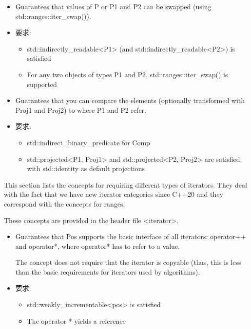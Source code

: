 
\begin{itemize}
\item
Guarantees that values of P or P1 and P2 can be swapped (using std::ranges::iter\_swap()).

\item
要求:
\begin{itemize}
\item
std::indirectly\_readable<P1> (and std::indirectly\_readable<P2>) is satisfied

\item
For any two objects of types P1 and P2, std::ranges::iter\_swap() is supported
\end{itemize}
\end{itemize}


\begin{itemize}
\item
Guarantees that you can compare the elements (optionally transformed with Proj1 and Proj2) to where P1 and P2 refer.

\item
要求:
\begin{itemize}
\item
std::indirect\_binary\_predicate for Comp

\item
std::projected<P1, Proj1> and std::projected<P2, Proj2> are satisfied with std::identity as default projections
\end{itemize}
\end{itemize}


This section lists the concepts for requiring different types of iterators. They deal with the fact that we have new iterator categories since C++20 and they correspond with the concepts for ranges.

These concepts are provided in the header file <iterator>.


\begin{itemize}
\item
Guarantees that Pos supports the basic interface of all iterators: operator++ and operator*, where operator* has to refer to a value.

The concept does not require that the iterator is copyable (thus, this is less than the basic requirements for iterators used by algorithms).

\item
要求:
\begin{itemize}
\item
std::weakly\_incrementable<pos> is satisfied

\item
The operator * yields a reference
\end{itemize}
\end{itemize}

